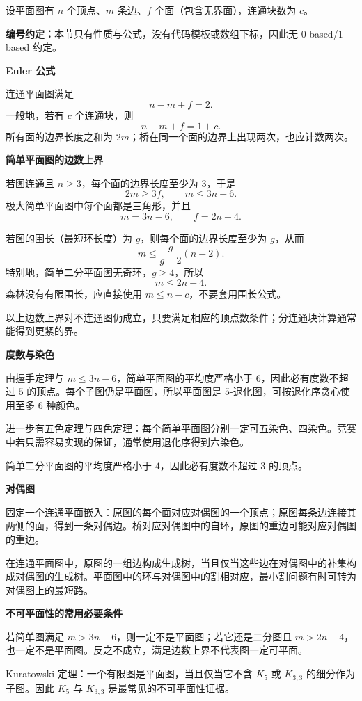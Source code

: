 设平面图有 $n$ 个顶点、$m$ 条边、$f$ 个面（包含无界面），连通块数为 $c$。

\textbf{编号约定：}本节只有性质与公式，没有代码模板或数组下标，因此无 $0$-based/$1$-based 约定。

\textbf{Euler 公式}

连通平面图满足
\[
  n-m+f=2.
\]
一般地，若有 $c$ 个连通块，则
\[
  n-m+f=1+c.
\]
所有面的边界长度之和为 $2m$；桥在同一个面的边界上出现两次，也应计数两次。

\textbf{简单平面图的边数上界}

若图连通且 $n\ge 3$，每个面的边界长度至少为 $3$，于是
\[
  2m\ge 3f,
  \qquad
  m\le 3n-6.
\]
极大简单平面图中每个面都是三角形，并且
\[
  m=3n-6,
  \qquad
  f=2n-4.
\]

若图的围长（最短环长度）为 $g$，则每个面的边界长度至少为 $g$，从而
\[
  m\le \frac{g}{g-2}(n-2).
\]
特别地，简单二分平面图无奇环，$g\ge4$，所以
\[
  m\le2n-4.
\]
森林没有有限围长，应直接使用 $m\le n-c$，不要套用围长公式。

以上边数上界对不连通图仍成立，只要满足相应的顶点数条件；分连通块计算通常能得到更紧的界。

\textbf{度数与染色}

由握手定理与 $m\le3n-6$，简单平面图的平均度严格小于 $6$，因此必有度数不超过 $5$ 的顶点。每个子图仍是平面图，所以平面图是 $5$-退化图，可按退化序贪心使用至多 $6$ 种颜色。

进一步有五色定理与四色定理：每个简单平面图分别一定可五染色、四染色。竞赛中若只需容易实现的保证，通常使用退化序得到六染色。

简单二分平面图的平均度严格小于 $4$，因此必有度数不超过 $3$ 的顶点。

\textbf{对偶图}

固定一个连通平面嵌入：原图的每个面对应对偶图的一个顶点；原图每条边连接其两侧的面，得到一条对偶边。桥对应对偶图中的自环，原图的重边可能对应对偶图的重边。

在连通平面图中，原图的一组边构成生成树，当且仅当这些边在对偶图中的补集构成对偶图的生成树。平面图中的环与对偶图中的割相对应，最小割问题有时可转为对偶图上的最短路。

\textbf{不可平面性的常用必要条件}

若简单图满足 $m>3n-6$，则一定不是平面图；若它还是二分图且 $m>2n-4$，也一定不是平面图。反之不成立，满足边数上界不代表图一定可平面。

Kuratowski 定理：一个有限图是平面图，当且仅当它不含 $K_5$ 或 $K_{3,3}$ 的细分作为子图。因此 $K_5$ 与 $K_{3,3}$ 是最常见的不可平面性证据。
